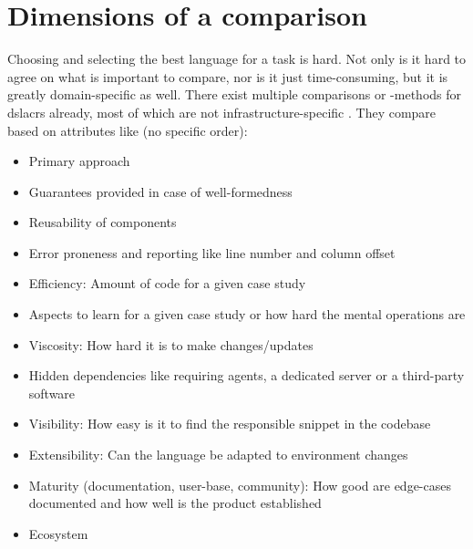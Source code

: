 \section{Dimensions of a comparison}
Choosing and selecting the best language for a task is hard. Not only is it hard to agree on what is important to compare, nor is it just time-consuming, but it is greatly domain-specific as well.
There exist multiple comparisons or -methods for \gls{dslacr}s already, most of which are not infrastructure-specific \cite{comparative_study_of_dsl_tools} \cite{comparing_gpl_dsl} \cite{dsl_for_iac} \cite{allgemeine_modeltheorie}. %
They compare based on attributes like (no specific order):

\begin{itemize}
  \item Primary approach \cite{comparative_study_of_dsl_tools}
  \item Guarantees provided in case of well-formedness \cite{comparative_study_of_dsl_tools} %
  \item Reusability of components \cite{comparative_study_of_dsl_tools}
  \item Error proneness and reporting like line number and column offset \cite{comparative_study_of_dsl_tools} \cite{comparing_gpl_dsl}
  \item Efficiency: Amount of code for a given case study \cite{comparative_study_of_dsl_tools}
  \item Aspects to learn for a given case study or how hard the mental operations are \cite{comparative_study_of_dsl_tools} %
  \item Viscosity: How hard it is to make changes/updates \cite{comparing_gpl_dsl}
  \item Hidden dependencies like requiring agents, a dedicated server or a third-party software \cite{comparing_gpl_dsl}
  \item Visibility: How easy is it to find the responsible snippet in the codebase \cite{comparing_gpl_dsl}
  \item Extensibility: Can the language be adapted to environment changes
  \item Maturity (documentation, user-base, community): How good are edge-cases documented and how well is the product established
  \item Ecosystem
\end{itemize}


